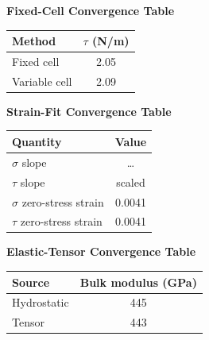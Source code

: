 \documentclass[11pt]{article}
\begin{document}
\noindent\textbf{Fixed-Cell Convergence Table}

\begin{center}
\begin{tabular}{lc}
\toprule
Method & $\tau$ (N/m) \\
\midrule
Fixed cell    & 2.05 \\
Variable cell & 2.09 \\
\bottomrule
\end{tabular}
\end{center}

\noindent\textbf{Strain-Fit Convergence Table}

\begin{center}
\begin{tabular}{lc}
\toprule
Quantity & Value \\
\midrule
$\sigma$ slope              & \ldots \\
$\tau$ slope                & scaled \\
$\sigma$ zero-stress strain & 0.0041 \\
$\tau$ zero-stress strain   & 0.0041 \\
\bottomrule
\end{tabular}
\end{center}

\noindent\textbf{Elastic-Tensor Convergence Table}

\begin{center}
\begin{tabular}{lc}
\toprule
Source & Bulk modulus (GPa) \\
\midrule
Hydrostatic & 445 \\
Tensor      & 443 \\
\bottomrule
\end{tabular}
\end{center}
\end{document}
